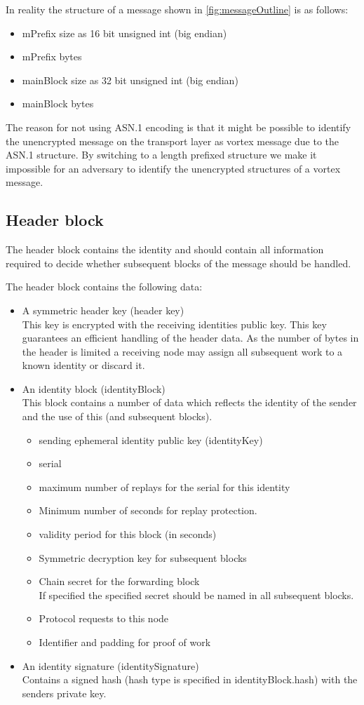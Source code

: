 In reality the structure of a message shown in \ref{fig:messageOutline} is as follows:
\begin{itemize}
	\item mPrefix size as 16 bit unsigned int (big endian)
	\item mPrefix bytes
	\item mainBlock size as 32 bit unsigned int (big endian)
	\item mainBlock bytes
\end{itemize}

The reason for not using ASN.1 encoding is that it might be possible to identify the unencrypted message on the transport layer as vortex message due to the ASN.1 structure. By switching to a length prefixed structure we make it impossible for an adversary to identify the unencrypted structures of a vortex message.

\subsection{Header block}
The header block contains the identity and should contain all information required to decide whether subsequent blocks of the message should be handled.

The header block contains the following data:
\begin{itemize}
	\item A symmetric header key (header key)\\
	This key is encrypted with the receiving identities public key. This key guarantees an efficient handling of the header data. As the number of bytes in the header is limited a receiving node may assign all subsequent work to a known identity or discard it.
	\item An identity block (identityBlock)\\
	This block contains a number of data which reflects the identity of the sender and the use of this (and subsequent blocks).
	\begin{itemize}
		\item sending ephemeral identity public key (identityKey)
		\item serial
		\item maximum number of replays for the serial for this identity
		\item Minimum number of seconds for replay protection.
		\item validity period for this block (in seconds)
		\item Symmetric decryption key for subsequent blocks
		\item Chain secret for the forwarding block\\
		If specified the specified secret should be named in all subsequent blocks.
		\item Protocol requests to this node
		\item Identifier and padding for proof of work
	\end{itemize}
	\item An identity signature (identitySignature)\\
	Contains a signed hash (hash type is specified in identityBlock.hash) with the senders private key.
\end{itemize}

